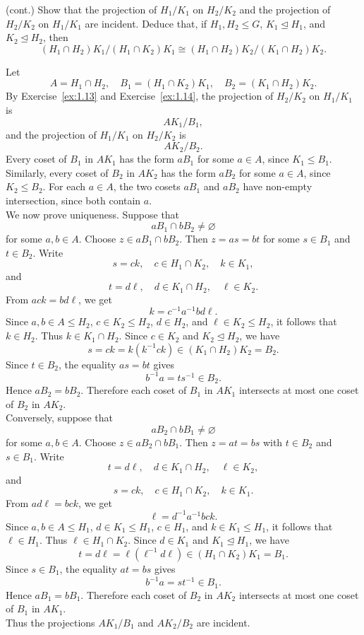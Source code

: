 \documentclass[../Odyssey_Project.tex]{subfiles}
\begin{document}
\begin{exercise}
\label{ex:1.15}
(cont.) Show that the projection of $H_1/K_1$ on $H_2/K_2$ and the projection of $H_2/K_2$ on $H_1/K_1$ are incident. Deduce that, if $H_1, H_2 \leq G$, \(K_1 \trianglelefteq H_1\), and \(K_2 \trianglelefteq H_2\), then
\[
    (H_1 \cap H_2)K_1/(H_1 \cap K_2)K_1
    \cong
    (H_1 \cap H_2)K_2/(K_1 \cap H_2)K_2.
\]
\end{exercise}
\begin{solution}
Let
\[
    A = H_1 \cap H_2,\quad
    B_1 = (H_1 \cap K_2)K_1,\quad
    B_2 = (K_1 \cap H_2)K_2.
\]
By Exercise~\ref{ex:1.13} and Exercise~\ref{ex:1.14}, the projection of \(H_2/K_2\) on \(H_1/K_1\) is
\[
    AK_1/B_1,
\]
and the projection of \(H_1/K_1\) on \(H_2/K_2\) is
\[
    AK_2/B_2.
\]
Every coset of \(B_1\) in \(AK_1\) has the form \(aB_1\) for some \(a \in A\), since \(K_1 \leq B_1\). Similarly, every coset of \(B_2\) in \(AK_2\) has the form \(aB_2\) for some \(a \in A\), since \(K_2 \leq B_2\). For each \(a \in A\), the two cosets \(aB_1\) and \(aB_2\) have non-empty intersection, since both contain \(a\). \\
We now prove uniqueness. Suppose that
\[
    aB_1 \cap bB_2 \neq \varnothing
\]
for some \(a,b \in A\). Choose \(z \in aB_1 \cap bB_2\). Then \(z=as=bt\) for some \(s \in B_1\) and \(t \in B_2\). Write
\[
    s=ck,\quad c \in H_1 \cap K_2,\quad k \in K_1,
\]
and
\[
    t=d\ell,\quad d \in K_1 \cap H_2,\quad \ell \in K_2.
\]
From \(ack=bd\ell\), we get
\[
    k = c^{-1}a^{-1}bd\ell.
\]
Since \(a,b \in A \leq H_2\), \(c \in K_2 \leq H_2\), \(d \in H_2\), and \(\ell \in K_2 \leq H_2\), it follows that \(k \in H_2\). Thus \(k \in K_1 \cap H_2\). Since \(c \in K_2\) and \(K_2 \trianglelefteq H_2\), we have
\[
    s=ck=k(k^{-1}ck) \in (K_1 \cap H_2)K_2 = B_2.
\]
Since \(t \in B_2\), the equality \(as=bt\) gives
\[
    b^{-1}a=ts^{-1}\in B_2.
\]
Hence \(aB_2=bB_2\). Therefore each coset of \(B_1\) in \(AK_1\) intersects at most one coset of \(B_2\) in \(AK_2\). \\
Conversely, suppose that
\[
    aB_2 \cap bB_1 \neq \varnothing
\]
for some \(a,b \in A\). Choose \(z \in aB_2 \cap bB_1\). Then \(z=at=bs\) with \(t \in B_2\) and \(s \in B_1\). Write
\[
    t=d\ell,\quad d \in K_1 \cap H_2,\quad \ell \in K_2,
\]
and
\[
    s=ck,\quad c \in H_1 \cap K_2,\quad k \in K_1.
\]
From \(ad\ell=bck\), we get
\[
    \ell = d^{-1}a^{-1}bck.
\]
Since \(a,b \in A \leq H_1\), \(d \in K_1 \leq H_1\), \(c \in H_1\), and \(k \in K_1 \leq H_1\), it follows that \(\ell \in H_1\). Thus \(\ell \in H_1 \cap K_2\). Since \(d \in K_1\) and \(K_1 \trianglelefteq H_1\), we have
\[
    t=d\ell=\ell(\ell^{-1}d\ell) \in (H_1 \cap K_2)K_1 = B_1.
\]
Since \(s \in B_1\), the equality \(at=bs\) gives
\[
    b^{-1}a=st^{-1}\in B_1.
\]
Hence \(aB_1=bB_1\). Therefore each coset of \(B_2\) in \(AK_2\) intersects at most one coset of \(B_1\) in \(AK_1\). \\
Thus the projections \(AK_1/B_1\) and \(AK_2/B_2\) are incident.
\end{solution}
\end{document}
